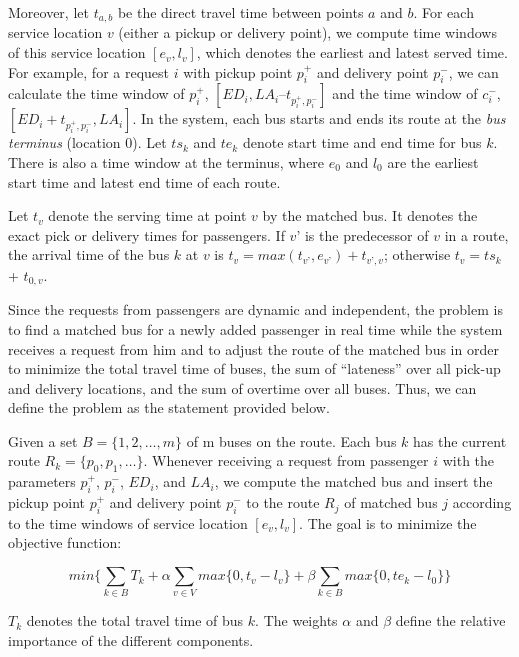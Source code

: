 \documentclass[runningheads]{llncs}
\begin{document}
Moreover, let $t_{a,b}$ be the direct travel time between points $a$ and $b$. For each service location $v$ (either a pickup or delivery point), we compute time windows of this service location $[e_v, l_v]$, which denotes the earliest and latest served time. For example, for a request $i$ with pickup point $p_i^+$ and delivery point $p_i^-$, we can calculate the time window of $p_i^+$, $[ED_i, LA_i – t_{p_i^+,p_i^-}]$ and the time window of $c_i^-$, $[ED_i + t_{p_i^+,p_i^-}, LA_i]$. In the system, each bus starts and ends its route at the \emph{bus terminus} (location 0). Let $ts_k$ and $te_k$ denote start time and end time for bus $k$. There is also a time window at the terminus, where $e_0$ and $l_0$ are the earliest start time and latest end time of each route.

Let $t_v$ denote the serving time at point $v$ by the matched bus. It denotes the exact pick or delivery times for passengers. If $v’$ is the predecessor of $v$ in a route, the arrival time of the bus $k$ at $v$ is $t_v = max(t_{v’}, e_{v’}) + t_{v’, v}$; otherwise $t_v = ts_k$ + $t_{0, v}$.


Since the requests from passengers are dynamic and independent, the problem is to find a matched bus for a newly added passenger in real time while the system receives a request from him and to adjust the route of the matched bus in order to minimize the total travel time of buses, the sum of ``lateness'' over all pick-up and delivery locations, and the sum of overtime over all buses. Thus, we can define the problem as the statement provided below.

Given a set $B = \{1, 2, \dots, m\}$ of m buses on the route. Each bus $k$ has the current route $R_k = \{p_0, p_1, \dots\}$. Whenever receiving a request from passenger $i$ with the parameters $p_i^+$, $p_i^-$, $ED_i$, and $LA_i$, we compute the matched bus and insert the pickup point $p_i^+$ and delivery point $p_i^-$ to the route $R_j$ of matched bus $j$ according to the time windows of service location $[e_v, l_v]$. The goal is to minimize the objective function:

\begin{equation}
min\{\sum_{k\in B}{T_k} + \alpha\sum_{v\in V}{max\{0, t_v - l_v\}} + \beta\sum_{k\in B}{max\{0, te_k - l_0\}} \}
\end{equation}

$T_k$ denotes the total travel time of bus $k$. The weights $\alpha$ and $\beta$ define the relative importance of the different components.
\end{document}
